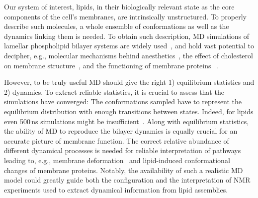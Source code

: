 \documentclass[journal=jpcbfk,manuscript=article,layout=twocolumn]{achemso}
\begin{document}
Our system of interest, lipids, in their biologically relevant state as the core components of the cell's membranes, are intrinsically unstructured.
To properly describe such molecules, a whole ensemble of conformations as well as the dynamics linking them is needed.
To obtain such description, MD simulations of lamellar phospholipid bilayer systems are widely 
used~\cite{lyubartsev11,chau07,ferreira13,botan15, ferreira15,miettinen19,XXX}, and
hold vast potential to decipher, e.g., molecular mechanisms behind anesthetics~\cite{chau07,XXX}, the effect of cholesterol on membrane structure~\cite{XXX,ferreira13}, and the functioning of membrane proteins~\cite{lindahl08} .

However, to be truly useful MD should
give the right 1) equilibrium statistics and 2) dynamics.
To extract reliable statistics, it is crucial to assess that the simulations have converged: The conformations sampled have to represent the equilibrium distribution with enough transitions between states. Indeed, for lipids even 500\,ns simulations might be insufficient~\cite{vogel12,ferreira15}.
%
Along with equilibrium statistics, the ability of MD to reproduce the bilayer dynamics is equally crucial for an accurate picture of membrane function. %
The correct relative abundance of different dynamical processes is needed for reliable interpretation of pathways leading to, e.g., membrane deformation~\cite{chernomordik08} and lipid-induced conformational~\cite{gibson93,phillips09} changes of membrane proteins. Notably, the availability of such a realistic MD model could greatly guide both the configuration and the interpretation of NMR experiments used to extract dynamical information from lipid assemblies.
\end{document}
